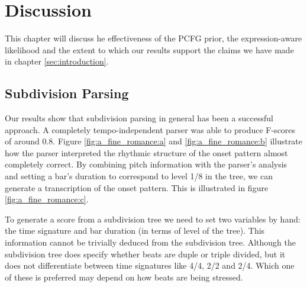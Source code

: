 \chapter{Discussion}
\label{sec:discussion}



This chapter will discuss he effectiveness of the PCFG prior, the expression-aware likelihood and the extent to which our results support the claims we have made in chapter \ref{sec:introduction}.

\section{Subdivision Parsing}

Our results show that subdivision parsing in general has been a successful approach. A completely tempo-independent parser was able to produce F-scores of around 0.8. Figure \ref{fig:a_fine_romance:a} and \ref{fig:a_fine_romance:b} illustrate how the parser interpreted the rhythmic structure of the onset pattern almost completely correct. By combining pitch information with the parser's analysis and setting a bar's duration to correspond to level 1/8 in the tree, we can generate a transcription of the onset pattern. This is illustrated in figure \ref{fig:a_fine_romance:c}.

To generate a score from a subdivision tree we need to set two variables by hand: the time signature and bar duration (in terms of level of the tree). This information cannot be trivially deduced from the subdivision tree. Although the subdivision tree does specify whether beats are duple or triple divided, but it does not differentiate between time signatures like 4/4, 2/2 and 2/4. Which one of these is preferred may depend on how beats are being stressed.

